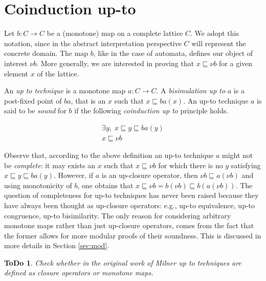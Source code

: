\documentclass[smallcondensed,envcountsect,envcountsame]{svjour3}     %
\newtheorem{todo}[theorem]{\bf ToDo}
\begin{document}
\section{Coinduction up-to}
\label{sec:upto}
Let $b \colon C \to C$ be a (monotone) map on a complete lattice $C$. We adopt this notation, since in the abstract interpretation perspective $C$ will represent the concrete domain. 
The map $b$, like in the case of automata, defines our object of interest $\nu b$. More generally, we are interested in proving that $x\sqsubseteq \nu b$ for a given element $x$ of the lattice.

An \emph{up to technique} is a monotone map $a \colon C \to C$. A \emph{bisimulation up to} $a$ is a post-fixed point of $ba$, that is an $x$ such that $x\sqsubseteq ba(x)$. An up-to technique $a$ is said to be \emph{sound} for $b$ if the following \emph{coinduction up to} principle holds.

\begin{equation}\label{eq:coinductionuptoproofprinciple}
 \begin{array}{c}
    \exists y, \; x \sqsubseteq y\sqsubseteq ba(y)\\
    \hline %
    x \sqsubseteq \nu b
\end{array}
\end{equation}

\begin{remark}\label{rmk:completenessupto}
Observe that, according to the above definition an up-to technique $a$ might not be \emph{complete}: it may exists an $x$ such that $x \sqsubseteq \nu b$ for which there is no $y$ satisfying  $x \sqsubseteq y\sqsubseteq ba(y)$. However, if $a$ is an up-closure operator, then $\nu b  \sqsubseteq a(\nu b)$ and using monotonicity of $b$, one obtains that 
$x \sqsubseteq \nu b = b(\nu b) \sqsubseteq b(a (\nu b))$. The question of completeness for up-to techniques has never been raised because they have always been thought as up-closure operators: e.g., up-to equivalence, up-to congruence, up-to bisimilarity. The only reason for considering arbitrary monotone maps rather than just up-closure operators, comes from the fact that the former allows for more modular proofs of their soundness. This is discussed in more details in Section \ref{sec:mod}.
\end{remark}

\begin{todo} 
Check whether in the original work of Milner up to techniques are defined as closure operators or monotone maps. 
\end{todo}
\end{document}

